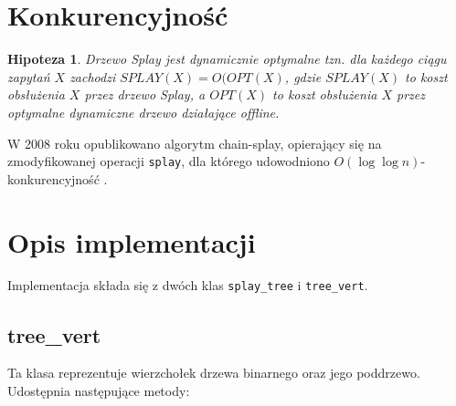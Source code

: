\documentclass[declaration,shortabstract]{iithesis}
\newcounter{thm}[section]
\theoremstyle{thm}
\theoremstyle{remark}
\theoremstyle{plain}
\theoremstyle{plain}
\newtheorem{hypothesis}[thm]{Hipoteza}
\theoremstyle{plain}
\begin{document}
\section{Konkurencyjność} 
\begin{hypothesis} 
Drzewo Splay jest dynamicznie optymalne tzn. dla każdego ciągu zapytań $X$ zachodzi \(SPLAY(X) = O(OPT(X)\),  gdzie \(SPLAY(X)\) to koszt obsłużenia \(X\) przez drzewo Splay, a \(OPT(X)\) to koszt obsłużenia $X$ przez optymalne dynamiczne drzewo działające offline. 
\end{hypothesis}  

W 2008 roku opublikowano algorytm chain-splay, opierający się na zmodyfikowanej operacji \texttt{splay}, dla którego udowodniono \(O(\log \log n) \)-konkurencyjność \cite{DBLP:journals/ipl/Georgakopoulos08}.

\section{Opis implementacji}  

Implementacja składa się z dwóch klas \texttt{splay\_tree} i \texttt{tree\_vert}. 

\subsection{tree\_vert} \label{tree_vert_imp}

Ta klasa reprezentuje wierzchołek drzewa binarnego oraz jego poddrzewo. Udostępnia następujące metody: 
\end{document}
